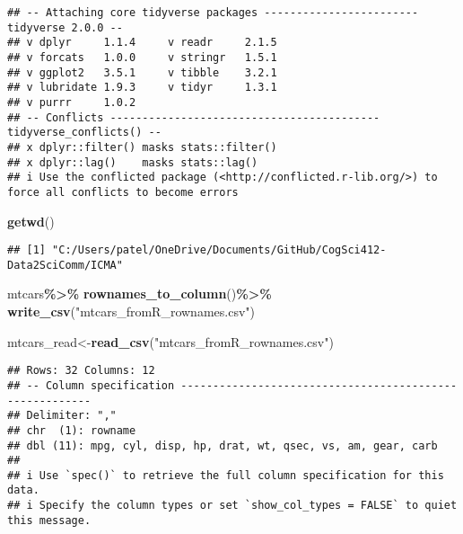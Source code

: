 \documentclass[
]{article}
\newenvironment{Shaded}{\begin{snugshade}}{\end{snugshade}}
\newcommand{\FunctionTok}[1]{\textcolor[rgb]{0.13,0.29,0.53}{\textbf{#1}}}
\newcommand{\NormalTok}[1]{#1}
\newcommand{\OtherTok}[1]{\textcolor[rgb]{0.56,0.35,0.01}{#1}}
\newcommand{\SpecialCharTok}[1]{\textcolor[rgb]{0.81,0.36,0.00}{\textbf{#1}}}
\newcommand{\StringTok}[1]{\textcolor[rgb]{0.31,0.60,0.02}{#1}}
\begin{document}
\begin{verbatim}
## -- Attaching core tidyverse packages ------------------------ tidyverse 2.0.0 --
## v dplyr     1.1.4     v readr     2.1.5
## v forcats   1.0.0     v stringr   1.5.1
## v ggplot2   3.5.1     v tibble    3.2.1
## v lubridate 1.9.3     v tidyr     1.3.1
## v purrr     1.0.2     
## -- Conflicts ------------------------------------------ tidyverse_conflicts() --
## x dplyr::filter() masks stats::filter()
## x dplyr::lag()    masks stats::lag()
## i Use the conflicted package (<http://conflicted.r-lib.org/>) to force all conflicts to become errors
\end{verbatim}

\begin{Shaded}
\begin{Highlighting}[]
\FunctionTok{getwd}\NormalTok{()}
\end{Highlighting}
\end{Shaded}

\begin{verbatim}
## [1] "C:/Users/patel/OneDrive/Documents/GitHub/CogSci412-Data2SciComm/ICMA"
\end{verbatim}

\begin{Shaded}
\begin{Highlighting}[]
\NormalTok{mtcars}\SpecialCharTok{\%\textgreater{}\%}
  \FunctionTok{rownames\_to\_column}\NormalTok{()}\SpecialCharTok{\%\textgreater{}\%}
  \FunctionTok{write\_csv}\NormalTok{(}\StringTok{"mtcars\_fromR\_rownames.csv"}\NormalTok{)}
\end{Highlighting}
\end{Shaded}

\begin{Shaded}
\begin{Highlighting}[]
\NormalTok{mtcars\_read}\OtherTok{\textless{}{-}}\FunctionTok{read\_csv}\NormalTok{(}\StringTok{"mtcars\_fromR\_rownames.csv"}\NormalTok{)}
\end{Highlighting}
\end{Shaded}

\begin{verbatim}
## Rows: 32 Columns: 12
## -- Column specification --------------------------------------------------------
## Delimiter: ","
## chr  (1): rowname
## dbl (11): mpg, cyl, disp, hp, drat, wt, qsec, vs, am, gear, carb
## 
## i Use `spec()` to retrieve the full column specification for this data.
## i Specify the column types or set `show_col_types = FALSE` to quiet this message.
\end{verbatim}
\end{document}
